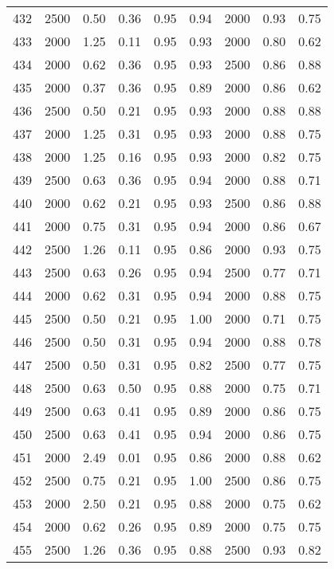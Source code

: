 \begin{longtable}[c]{ccccccccc}
432 &  2500 &  0.50 &  0.36 &  0.95 &  0.94 &  2000 &  0.93 &  0.75 \\
433 &  2000 &  1.25 &  0.11 &  0.95 &  0.93 &  2000 &  0.80 &  0.62 \\
434 &  2000 &  0.62 &  0.36 &  0.95 &  0.93 &  2500 &  0.86 &  0.88 \\
435 &  2000 &  0.37 &  0.36 &  0.95 &  0.89 &  2000 &  0.86 &  0.62 \\
436 &  2500 &  0.50 &  0.21 &  0.95 &  0.93 &  2000 &  0.88 &  0.88 \\
437 &  2000 &  1.25 &  0.31 &  0.95 &  0.93 &  2000 &  0.88 &  0.75 \\
438 &  2000 &  1.25 &  0.16 &  0.95 &  0.93 &  2000 &  0.82 &  0.75 \\
439 &  2500 &  0.63 &  0.36 &  0.95 &  0.94 &  2000 &  0.88 &  0.71 \\
440 &  2000 &  0.62 &  0.21 &  0.95 &  0.93 &  2500 &  0.86 &  0.88 \\
441 &  2000 &  0.75 &  0.31 &  0.95 &  0.94 &  2000 &  0.86 &  0.67 \\
442 &  2500 &  1.26 &  0.11 &  0.95 &  0.86 &  2000 &  0.93 &  0.75 \\
443 &  2500 &  0.63 &  0.26 &  0.95 &  0.94 &  2500 &  0.77 &  0.71 \\
444 &  2000 &  0.62 &  0.31 &  0.95 &  0.94 &  2000 &  0.88 &  0.75 \\
445 &  2500 &  0.50 &  0.21 &  0.95 &  1.00 &  2000 &  0.71 &  0.75 \\
446 &  2500 &  0.50 &  0.31 &  0.95 &  0.94 &  2000 &  0.88 &  0.78 \\
447 &  2500 &  0.50 &  0.31 &  0.95 &  0.82 &  2500 &  0.77 &  0.75 \\
448 &  2500 &  0.63 &  0.50 &  0.95 &  0.88 &  2000 &  0.75 &  0.71 \\
449 &  2500 &  0.63 &  0.41 &  0.95 &  0.89 &  2000 &  0.86 &  0.75 \\
450 &  2500 &  0.63 &  0.41 &  0.95 &  0.94 &  2000 &  0.86 &  0.75 \\
451 &  2000 &  2.49 &  0.01 &  0.95 &  0.86 &  2000 &  0.88 &  0.62 \\
452 &  2500 &  0.75 &  0.21 &  0.95 &  1.00 &  2500 &  0.86 &  0.75 \\
453 &  2000 &  2.50 &  0.21 &  0.95 &  0.88 &  2000 &  0.75 &  0.62 \\
454 &  2000 &  0.62 &  0.26 &  0.95 &  0.89 &  2000 &  0.75 &  0.75 \\
455 &  2500 &  1.26 &  0.36 &  0.95 &  0.88 &  2500 &  0.93 &  0.82 \\

\end{longtable}

